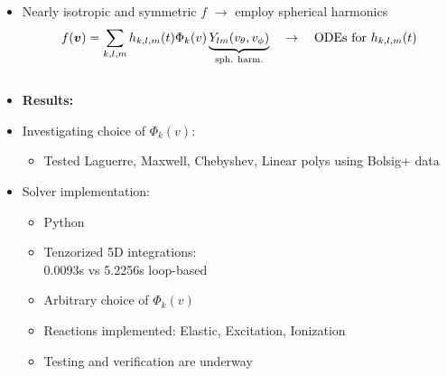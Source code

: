 \documentclass[mathserif, aspectratio=169]{beamer}
\newcommand{\vect}[1]{\boldsymbol{#1}}
\newcommand{\of}[1]{\mleft( #1 \mright)}
\newcommand{\vth}{v_{\textrm{th}}}
\begin{document}
\begin{frame}
{\begin{columns}[T]
\begin{column}{.71\linewidth}
\begin{itemize}
\begin{itemize}
\item Nearly isotropic and symmetric $f$ $\rightarrow$ employ spherical harmonics
\begin{align*}
f\of{\vect{v}}
=
\sum_{k,l,m} h_{k,l,m} \of{t} \Phi_k\of{v} \underbrace{Y_{lm}\of{v_\theta, v_\phi}}_{\tiny\text{sph. harm.}}
\quad \rightarrow \quad \text{ODEs for } h_{k,l,m} \of{t}
\end{align*}
\end{itemize}
\end{itemize}
\begin{columns}[T]
\begin{column}{.5\linewidth}
\begin{itemize}
\item[] \textbf{Results:}
\item Investigating choice of $\Phi_k(v)$:
\begin{itemize}
\item Tested Laguerre, Maxwell, Chebyshev, Linear polys using Bolsig+ data
\end{itemize}
\item Solver implementation:
\begin{itemize}
\item Python
\item Tenzorized 5D integrations: \\0.0093s vs 5.2256s loop-based
\item Arbitrary choice of $\Phi_k(v)$
\item Reactions implemented:
Elastic, Excitation, Ionization
\item Testing and verification are underway
\end{itemize}
\end{itemize}
\end{column}

\end{columns}
\end{column}
\end{columns}}
\end{frame}
\end{document}
